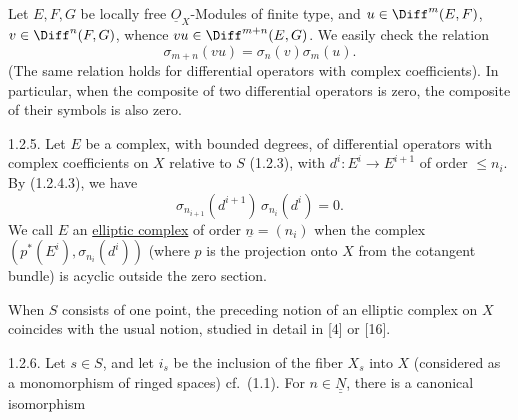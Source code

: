 Let $E,F,G$ be locally free $\underline{O}_X$-Modules of finite type, and $u\in\Diff^m(E,F)$, $v\in\Diff^n(F,G)$, whence $vu\in\Diff^{m+n}(E,G)$. We easily check the relation
\begin{equation}\tag{1.2.4.3}
  \sigma_{m+n}(vu)=\sigma_n(v)\sigma_m(u).
\end{equation}
(The same relation holds for differential operators with complex coefficients). In particular, when the composite of two differential operators is zero, the composite of their symbols is also zero.

1.2.5. Let $E$ be a complex, with bounded degrees, of differential operators with complex coefficients on $X$ relative to $S$ (1.2.3), with $d^i:E^i\longrightarrow E^{i+1}$ of order $\le n_i$. By (1.2.4.3), we have
\[
  \sigma_{n_{i+1}}(d^{i+1})\,\sigma_{n_i}(d^i)=0.
\]
We call $E$ an \uline{elliptic complex} of order $\underline{n}=(n_i)$ when the complex $(p^*(E^i),\sigma_{n_i}(d^i))$ (where $p$ is the projection onto $X$ from the cotangent bundle) is acyclic outside the zero section.

When $S$ consists of one point, the preceding notion of an elliptic complex on $X$ coincides with the usual notion, studied in detail in [4] or [16].

1.2.6. Let $s\in S$, and let $i_s$ be the inclusion of the fiber $X_s$ into $X$ (considered as a monomorphism of ringed spaces) cf.~(1.1). For $n\in\underline{\underline{N}}$, there is a canonical isomorphism

